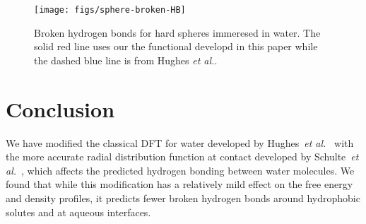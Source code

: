 \documentclass[twocolumn,amsmath,amssymb,prl]{revtex4-1}
\newcommand\hughesetal{Hughes \emph{et al.}}
\begin{document}
\begin{figure}
\begin{center}
\texttt{[image: figs/sphere-broken-HB]}
\end{center}
\caption{Broken hydrogen bonds for hard spheres immeresed in water.
  The solid red line uses our the functional developd in this paper
  while the dashed blue line is from
  \hughesetal.}
\label{fig:spheres-broken-HB}
\end{figure}

\section{Conclusion}

We have modified the classical DFT for water developed by
Hughes~\emph{et al.}~\cite{hughes2013classical} with the more accurate
radial distribution function at contact developed by Schulte~\emph{et
  al.}~\cite{schulte2012using}, which affects the predicted hydrogen
bonding between water molecules.  We found that while this
modification has a relatively mild effect on the free energy and
density profiles, it predicts fewer broken hydrogen bonds around
hydrophobic solutes and at aqueous interfaces.

\end{document}
